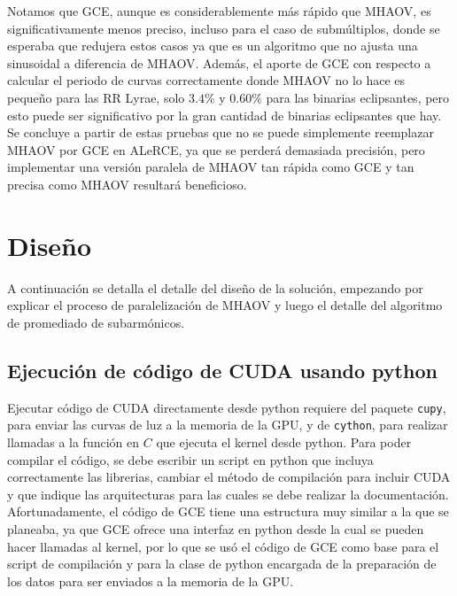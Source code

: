 Notamos que GCE, aunque es considerablemente más rápido que MHAOV, es significativamente menos preciso, incluso para el caso de submúltiplos, donde se esperaba que redujera estos casos ya que es un algoritmo que no ajusta una sinusoidal a diferencia de MHAOV. Además, el aporte de GCE con respecto a calcular el periodo de curvas correctamente donde MHAOV no lo hace es pequeño para las RR Lyrae, solo $3.4\%$ y $0.60\%$ para las binarias eclipsantes, pero esto puede ser significativo por la gran cantidad de binarias eclipsantes que hay. Se concluye a partir de estas pruebas que no se puede simplemente reemplazar MHAOV por GCE en ALeRCE, ya que se perderá demasiada precisión, pero implementar una versión paralela de MHAOV tan rápida como GCE y tan precisa como MHAOV resultará beneficioso.





\chapter{Diseño}\label{chap:diseño}
A continuación se detalla el detalle del diseño de la solución, empezando por explicar el proceso de paralelización de MHAOV y luego el detalle del algoritmo de promediado de subarmónicos.

\section{Ejecución de código de CUDA usando python}\label{sec:python-cuda}
Ejecutar código de CUDA directamente desde python requiere del paquete \texttt{cupy}, para enviar las curvas de luz a la memoria de la GPU, y de \texttt{cython}, para realizar llamadas a la función en $C$ que ejecuta el kernel desde python. Para poder compilar el código, se debe escribir un script en python que incluya correctamente las librerias, cambiar el método de compilación para incluir CUDA y que indique las arquitecturas para las cuales se debe realizar la documentación. Afortunadamente, el código de GCE tiene una estructura muy similar a la que se planeaba, ya que GCE ofrece una interfaz en python desde la cual se pueden hacer llamadas al kernel, por lo que se usó el código de GCE como base para el script de compilación y para la clase de python encargada de la preparación de los datos para ser enviados a la memoria de la GPU.

